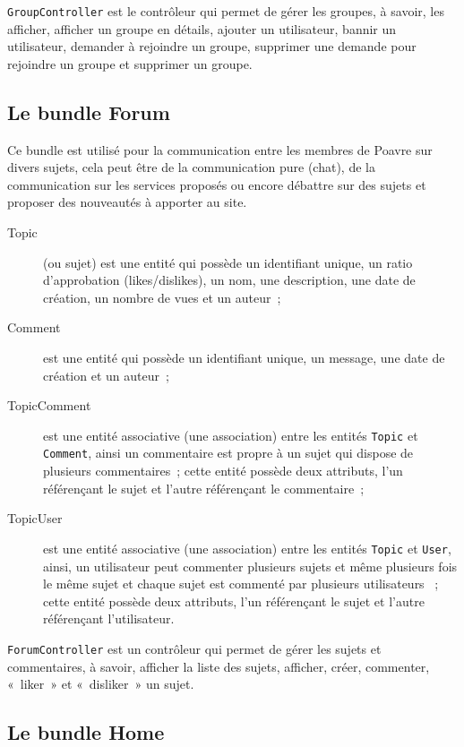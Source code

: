 \verb|GroupController| est le contrôleur qui permet de gérer les groupes, à savoir, les afficher, afficher un groupe en détails, ajouter un utilisateur, bannir un utilisateur, demander à rejoindre un groupe, supprimer une demande pour rejoindre un groupe et supprimer un groupe.

\subsection{Le bundle Forum}


Ce bundle est utilisé pour la communication entre les membres de Poavre sur divers sujets, cela peut être de la communication pure (chat), de la communication sur les services proposés ou encore débattre sur des sujets et proposer des nouveautés à apporter au site.

\begin{description}
    \item [Topic] (ou sujet) est une entité qui possède un identifiant unique, un ratio d'approbation (likes/dislikes), un nom, une description, une date de création, un nombre de vues et un auteur~;
    \item [Comment] est une entité qui possède un identifiant unique, un message, une date de création et un auteur~;
    \item [TopicComment] est une entité associative (une association) entre les entités \verb|Topic| et \verb|Comment|, ainsi un commentaire est propre à un sujet qui dispose de plusieurs commentaires~;
    cette entité possède deux attributs, l'un référençant le sujet et l'autre référençant le commentaire~;
    \item [TopicUser] est une entité associative (une association) entre les entités \verb|Topic| et \verb|User|, ainsi, un utilisateur peut commenter plusieurs sujets et même plusieurs fois le même sujet et chaque sujet est commenté par plusieurs utilisateurs~ ;
    cette entité possède deux attributs, l'un référençant le sujet et l'autre référençant l'utilisateur.
\end{description} 

\verb|ForumController| est un contrôleur qui permet de gérer les sujets et commentaires, à savoir, afficher la liste des sujets, afficher, créer, commenter, «~liker~» et «~disliker~» un sujet.

\subsection{Le bundle Home}

